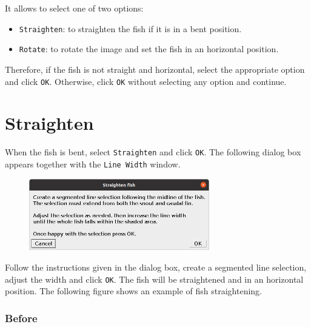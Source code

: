 \documentclass[
  letterpaper,
]{scrbook}
\providecommand{\tightlist}{%
  \setlength{\itemsep}{0pt}\setlength{\parskip}{0pt}}\usepackage{longtable,booktabs,array}
\begin{document}
It allows to select one of two options:

\begin{itemize}
\tightlist
\item
  \texttt{Straighten}: to straighten the fish if it is in a bent
  position.
\item
  \texttt{Rotate}: to rotate the image and set the fish in an horizontal
  position.
\end{itemize}

Therefore, if the fish is not straight and horizontal, select the
appropriate option and click \texttt{OK}. Otherwise, click \texttt{OK}
without selecting any option and continue.

\hypertarget{straighten}{%
\section*{Straighten}\label{straighten}}

When the fish is bent, select \texttt{Straighten} and click \texttt{OK}.
The following dialog box appears together with the \texttt{Line\ Width}
window.

\begin{figure}

{\centering \includegraphics[width=0.7\textwidth,height=\textheight]{./images/screenshots/straighten_dialog.png}

}

\end{figure}

Follow the instructions given in the dialog box, create a segmented line
selection, adjust the width and click \texttt{OK}. The fish will be
straightened and in an horizontal position. The following figure shows
an example of fish straightening.

\hypertarget{before}{%
\subsubsection{\texorpdfstring{\textbf{Before}}{Before}}\label{before}}
\end{document}
